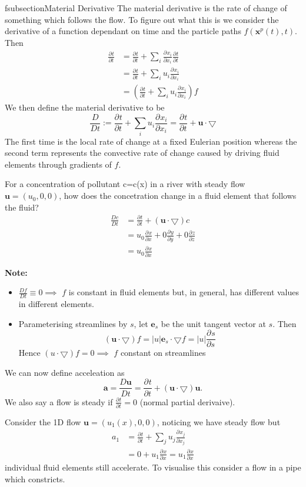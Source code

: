 \documentclass[11pt]{article}
\newcommand*{\pd}[3][]{\ensuremath{\frac{\partial^{#1} {#3}}{\partial {#3}^{#1}}}}
\newcommand*{\md}[1]{\ensuremath{\frac{D #1}{D t}}}
\newcommand{\grad}{\bigtriangledown}
\newcommand{\defeq}{:=}
\newenvironment{eg}
    {\begin{mdframed}[backgroundcolor=mylg, roundcorner=5pt, linewidth=0pt]}
    {\end{mdframed}}
\newenvironment{note}
    {\textbf{Note:}\begin{mdframed}[backgroundcolor=white, roundcorner=5pt, linewidth=0pt]}
    {\end{mdframed}}
\newcommand{\mv}[1]{\textbf{#1}}
\newcommand{\mdf}[1]{{\color{red}#1}}
\begin{document}
fsubsection{Material Derivative}
The \mdf{material derivative} is the rate of change of something which follows the flow. To figure out what this is we consider the derivative of a function dependant on time and the particle paths $f(\mv{x}^p(t),t)$. Then
\begin{align*}
    \pd{f}{t}&=\pd{f}{t}+\sum_i \pd{f}{x_i}\pd{x_i}{t}\\
             &=\pd{f}{t}+\sum_i u_i\pd{f}{x_i}\\
             &=\left(\pd{ }{t} + \sum_i u_i\pd{ }{x_i}\right)f
\end{align*}
We then define the \mdf{material derivative} to be
$$\md{ }\defeq \pd{ }{t}+\sum_i u_i\pd{ }{x_i}=\pd{ }{t}+\mv{u}\cdot\grad$$
The first time is the local rate of change at a fixed Eulerian position whereas the second term represents the convective rate of change caused by driving fluid elements through gradients of $f$.
\begin{eg}
For a concentration of pollutant c=c(x) in a river with steady flow $\mv{u}=(u_0,0,0)$, how does the concetration change in a fluid element that follows the fluid?
\begin{align*}
    \md{c}&=\pd{c}{t}+(\mv{u}\cdot\grad)c\\
          &=u_0\pd{c}{x}+0\pd{c}{y}+0\pd{c}{z}\\
          &=u_0\pd{c}{x}
\end{align*}
\end{eg}
\begin{note}
\begin{itemize}
    \item $\md{f}\equiv 0 \implies$ $f$ is constant in fluid elements but, in general, has different values in different elements.
    \item Parameterising streamlines by $s$, let $\mv{e}_s$ be the unit tangent vector at $s$. Then
    $$(\mv{u}\cdot\grad) f= |u|\mv{e}_s\cdot\grad f=|u|\pd{f}{s}$$
    Hence $(u\cdot\grad)f = 0\implies$ $f$ constant on streamlines
\end{itemize}
\end{note}
We can now define \mdf{acceleation} as
$$\mv{a}=\md{\mv{u}}=\pd{\mv{u}}{t}+(\mv{u}\cdot\grad)\mv{u}.$$
We also say a flow is \mdf{steady} if $\pd{\mv{u}}{t}=0$ (normal partial derivaive).
\begin{eg}
Consider the 1D flow $\mv{u}=(u_1(x),0,0)$, noticing we have steady flow but
\begin{align*}
    a_1&=\pd{u_1}{t}+\sum_j u_j\pd{u_1}{x_j}\\
       &= 0 + u_1 \pd{u_1}{x} = u_1 \pd{u_1}{x}
\end{align*}
individual fluid elements still accelerate. To visualise this consider a flow in a pipe which constricts.
\end{eg}
\end{document}
